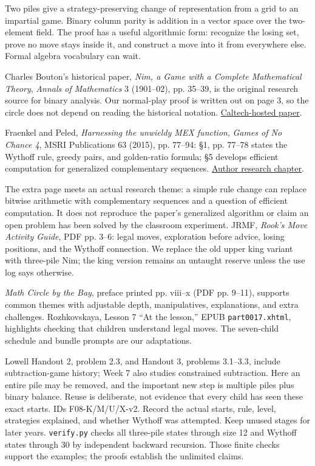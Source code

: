 \documentclass[11pt]{article}
\begin{document}
Two piles give a strategy-preserving change of representation from a grid to an impartial game. Binary column parity is addition in a vector space over the two-element field. The proof has a useful algorithmic form: recognize the losing set, prove no move stays inside it, and construct a move into it from everywhere else. Formal algebra vocabulary can wait.

Charles Bouton's historical paper, \emph{Nim, a Game with a Complete Mathematical Theory}, \emph{Annals of Mathematics} 3 (1901--02), pp. 35--39, is the original research source for binary analysis. Our normal-play proof is written out on page 3, so the circle does not depend on reading the historical notation. \href{https://paradise.caltech.edu/ist4/lectures/Bouton1901.pdf}{Caltech-hosted paper}.

Fraenkel and Peled, \emph{Harnessing the unwieldy MEX function}, \emph{Games of No Chance 4}, MSRI Publications 63 (2015), pp. 77--94: \S1, pp. 77--78 states the Wythoff rule, greedy pairs, and golden-ratio formula; \S5 develops efficient computation for generalized complementary sequences. \href{https://library.slmath.org/books/Book63/files/131104-Fraenkel-2.pdf}{Author research chapter}.

The extra page meets an actual research theme: a simple rule change can replace bitwise arithmetic with complementary sequences and a question of efficient computation. It does not reproduce the paper's generalized algorithm or claim an open problem has been solved by the classroom experiment.
JRMF, \emph{Rook's Move Activity Guide}, PDF pp. 3--6: legal moves, exploration before advice, losing positions, and the Wythoff connection. We replace the old upper king variant with three-pile Nim; the king version remains an untaught reserve unless the use log says otherwise.

\emph{Math Circle by the Bay}, preface printed pp. viii--x (PDF pp. 9--11), supports common themes with adjustable depth, manipulatives, explanations, and extra challenges. Rozhkovskaya, Lesson 7 ``At the lesson,'' EPUB \texttt{part0017.xhtml}, highlights checking that children understand legal moves. The seven-child schedule and bundle prompts are our adaptations.

Lowell Handout 2, problem 2.3, and Handout 3, problems 3.1--3.3, include subtraction-game history; Week 7 also studies constrained subtraction. Here an entire pile may be removed, and the important new step is multiple piles plus binary balance. Reuse is deliberate, not evidence that every child has seen these exact starts.
IDs F08-K/M/U/X-v2. Record the actual starts, rule, level, strategies explained, and whether Wythoff was attempted. Keep unused stages for later years. \texttt{verify.py} checks all three-pile states through size 12 and Wythoff states through 30 by independent backward recursion. Those finite checks support the examples; the proofs establish the unlimited claims.
\end{document}
